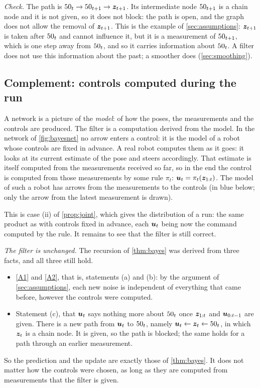 \begin{center}

\end{center}

\emph{Check.} The path is $50_t\rightarrow50_{t+1}\rightarrow\bm{z}_{t+1}$.
Its intermediate node $50_{t+1}$ is a chain node and it is not given, so
it does not block: the path is open, and the graph does not allow the
removal of $\bm{z}_{t+1}$.
This is the example of \cref{sec:assumptions}: $\bm{z}_{t+1}$ is taken after
$50_t$ and cannot influence it, but it is a measurement of $50_{t+1}$,
which is one step away from $50_t$, and so it carries information about
$50_t$. A filter does not use this information about the past; a smoother
does (\cref{sec:smoothing}).

\subsection*{Complement: controls computed during the run}

A network is a picture of the \emph{model}: of how the poses, the
measurements and the controls are produced. The filter is a computation
derived from the model. In the network of \cref{fig:bayesnet} no arrow
enters a control: it is the model of a robot whose controls are fixed in
advance. A real robot computes them as it goes: it looks at its current
estimate of the pose and steers accordingly. That estimate is itself
computed from the measurements received so far, so in the end the control
is computed from those measurements by some rule $\pi_t$:
$\bm{u}_t=\pi_t(\bm{z}_{1:t})$. The model of such a robot has arrows from the
measurements to the controls (in blue below; only the arrow from the
latest measurement is drawn).

\begin{center}

\end{center}

This is case (ii) of \cref{prop:joint}, which gives the distribution of a
run: the same product as with controls fixed in advance, each $\bm{u}_t$
being now the command computed by the rule. It remains to see that the
filter is still correct.

\emph{The filter is unchanged.} The recursion of \cref{thm:bayes} was
derived from three facts, and all three still hold.
\begin{itemize}[nosep]
  \item \ref{A1} and \ref{A2}, that is, statements (a) and (b): by the
    argument of \cref{sec:assumptions}, each new noise is independent of
    everything that came before, however the controls were computed.
  \item Statement (c), that $\bm{u}_t$ says nothing more about $50_t$ once
    $\bm{z}_{1:t}$ and $\bm{u}_{0:t-1}$ are given. There is a new path from
    $\bm{u}_t$ to $50_t$, namely $\bm{u}_t\leftarrow\bm{z}_t\leftarrow50_t$, in
    which $\bm{z}_t$ is a chain node. It is given, so the path is blocked; the
    same holds for a path through an earlier measurement.
\end{itemize}
So the prediction and the update are exactly those of \cref{thm:bayes}.
It does not matter how the controls were chosen, as long as they are
computed from measurements that the filter is given.

